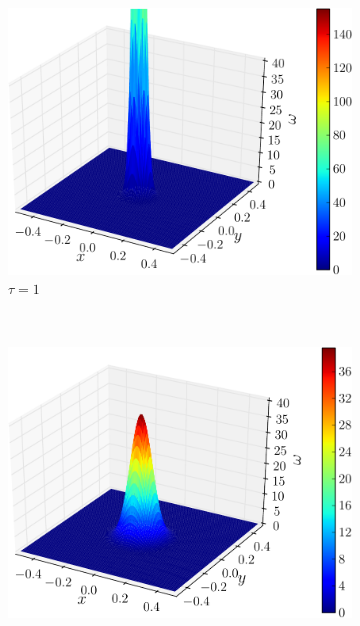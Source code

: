 	\begin{figure}[!t]
        \centering
        \begin{subfigure}[b]{0.3\textwidth}
                \includegraphics[width=\textwidth]{figures/lagrangian/lambOseen_definition_tau=1-crop.pdf}
                \caption{$\tau = 1$}
                \label{fig:lambOseen_tau1}
        \end{subfigure}%
        ~ %
        \begin{subfigure}[b]{0.3\textwidth}
                \includegraphics[width=\textwidth]{figures/lagrangian/lambOseen_definition_tau=4-crop.pdf}

\end{subfigure}
\end{figure}
